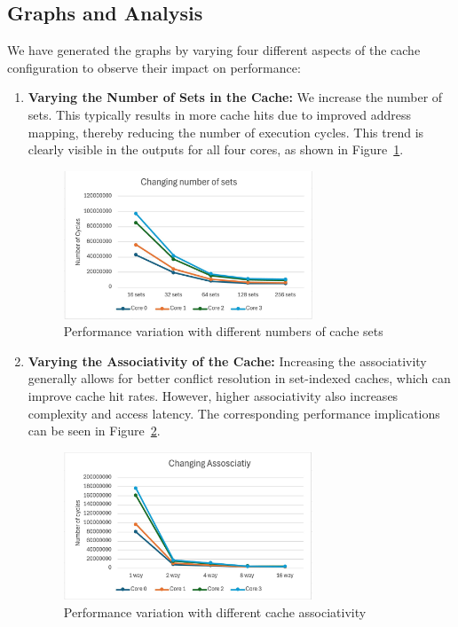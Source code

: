 \documentclass{article}
\begin{document}
\subsection{Graphs and Analysis}

We have generated the graphs by varying four different aspects of the cache configuration to observe their impact on performance:

\begin{enumerate}
    \item \textbf{Varying the Number of Sets in the Cache:}  We increase the number of sets. This typically results in more cache hits due to improved address mapping, thereby reducing the number of execution cycles. This trend is clearly visible in the outputs for all four cores, as shown in Figure~\ref{fig:sets_variation}.
    
    \begin{figure}[H]
        \centering
        \includegraphics[width=0.7\textwidth]{1.jpeg}
        \caption{Performance variation with different numbers of cache sets}
        \label{fig:sets_variation}
    \end{figure}

    \item \textbf{Varying the Associativity of the Cache:} Increasing the associativity generally allows for better conflict resolution in set-indexed caches, which can improve cache hit rates. However, higher associativity also increases complexity and access latency. The corresponding performance implications can be seen in Figure~\ref{fig:assoc_variation}.
    
    \begin{figure}[H]
        \centering
        \includegraphics[width=0.7\textwidth]{2.jpeg}
        \caption{Performance variation with different cache associativity}
        \label{fig:assoc_variation}
    \end{figure}


\end{enumerate}
\end{document}
